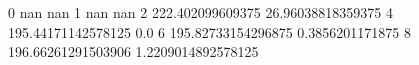 0 nan nan
1 nan nan
2 222.402099609375 26.96038818359375
4 195.44171142578125 0.0
6 195.82733154296875 0.3856201171875
8 196.66261291503906 1.2209014892578125

